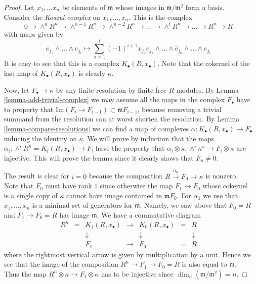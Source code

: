 \begin{proof}
Let $x_1 , \ldots x_n$ be elements of $\mathfrak m$
whose images in $\mathfrak m / \mathfrak m^2$ form a basis.
Consider the {\it Koszul complex} on $x_1,\ldots,x_n$.
This is the complex
$$
0 \to \wedge^n R^n \to \wedge^{n-1} R^n \to \wedge^{n-2} R^n \to
\ldots \to \wedge^i R^n \to \ldots \to R^n \to R
$$
with maps given by
$$
e_{j_1} \wedge \ldots \wedge e_{j_i}
\longmapsto
\sum_{a = 1}^i (-1)^{i + 1} x_{j_a} e_{j_1} \wedge \ldots
\wedge \hat e_{j_a} \wedge \ldots \wedge e_{j_i}
$$
It is easy to see that this is a complex $K_{\bullet}(R, x_{\bullet})$.
Note that the cokernel of the last map of $K_{\bullet}(R, x_{\bullet})$
is clearly $\kappa$.

\medskip\noindent
Now, let $F_{\bullet} \to \kappa$ by any finite resolution by
finite free $R$-modules. By Lemma \ref{lemma-add-trivial-complex} 
we may assume all the maps in the complex $F_{\bullet}$
have to property that $\text{Im}(F_i \to F_{i-1})
\subset \mathfrak m F_{i-1}$, because removing a trivial
summand from the resolution can at worst shorten the resolution.
By Lemma \ref{lemma-compare-resolutions} we can find a map
of complexes $\alpha : K_{\bullet}(R, x_{\bullet}) \to F_{\bullet}$
inducing the identity on $\kappa$. We will prove by induction
that the maps $\alpha_i : \wedge^i R^n = K_i(R, x_{\bullet}) \to F_i$
have the property that $\alpha_i \otimes \kappa
: \wedge^i \kappa^n \to F_i \otimes \kappa$ are injective.
This will prove the lemma since it clearly shows that
$F_n \not = 0$.

\medskip\noindent
The result is clear for $i = 0$ because the composition
$R \xrightarrow{\alpha_0} F_0 \to \kappa$ is nonzero.
Note that $F_0$ must have rank $1$ since
otherwise the map $F_1 \to F_0$ whose cokernel is a single
copy of $\kappa$ cannot have image contained in $\mathfrak m F_0$.
For $\alpha_1$ we use that $x_1,\ldots,x_n$ is a minimal
set of generators for $\mathfrak m$. Namely, we saw above that
$F_0 = R$ and $F_1 \to F_0 = R$ has image $\mathfrak m$.
We have a commutative diagram
$$
\begin{matrix}
R^n & = & K_1(R, x_{\bullet}) & \to & K_0(R,x_{\bullet}) & = & R \\
& & \downarrow & & \downarrow & & \downarrow \\
& & F_1 & \to & F_0 & = & R
\end{matrix}
$$
where the rightmost vertical arrow is given by multiplication
by a unit. Hence we see that the image of the composition
$R^n \to F_1 \to F_0 = R$ is also equal to $\mathfrak m$.
Thus the map $R^n \otimes \kappa \to F_1 \otimes \kappa$
has to be injective since $\dim_\kappa (\mathfrak m / \mathfrak m^2) = n$.


\end{proof}
